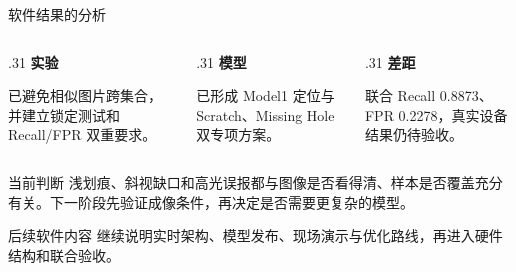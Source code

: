 \documentclass[aspectratio=169,10pt]{beamer}
\begin{document}
\begin{frame}{软件结果的分析}
  \begin{columns}[T,onlytextwidth]
    \begin{column}{.31\textwidth}
      \centering
      {\color{seugreen}\Large\bfseries 实验}

      \vspace{.5em}
      已避免相似图片跨集合，并建立锁定测试和 Recall/FPR 双重要求。
    \end{column}
    \begin{column}{.31\textwidth}
      \centering
      {\color{seugreen}\Large\bfseries 模型}

      \vspace{.5em}
      已形成 Model1 定位与 Scratch、Missing Hole 双专项方案。
    \end{column}
    \begin{column}{.31\textwidth}
      \centering
      {\color{seugreen}\Large\bfseries 差距}

      \vspace{.5em}
      联合 Recall 0.8873、FPR 0.2278，真实设备结果仍待验收。
    \end{column}
  \end{columns}

  \vspace{1.1em}
  \begin{block}{当前判断}
    浅划痕、斜视缺口和高光误报都与图像是否看得清、样本是否覆盖充分有关。下一阶段先验证成像条件，再决定是否需要更复杂的模型。
  \end{block}

  \vfill
  \begin{exampleblock}{后续软件内容}
    继续说明实时架构、模型发布、现场演示与优化路线，再进入硬件结构和联合验收。
  \end{exampleblock}
\end{frame}

\end{document}
